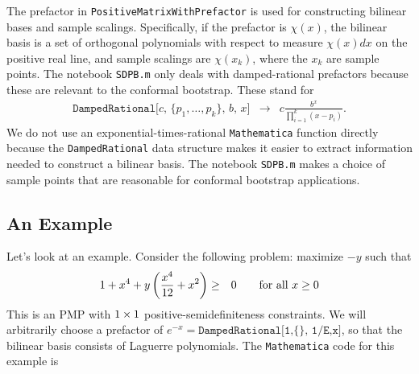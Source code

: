 \documentclass[12pt]{article}
\numberwithin{equation}{section}
\renewcommand{\be}{\begin{eqnarray}}
\renewcommand{\ee}{\end{eqnarray}}
\begin{document}
The prefactor in \texttt{PositiveMatrixWithPrefactor} is used for constructing bilinear bases and sample scalings.  Specifically, if the prefactor is $\chi(x)$, the bilinear basis is a set of orthogonal polynomials with respect to measure $\chi(x)dx$ on the positive real line, and sample scalings are $\chi(x_k)$, where the $x_k$ are sample points.
 The notebook \texttt{SDPB.m} only deals with damped-rational prefactors because these are relevant to the conformal bootstrap.  These stand for
\be
\texttt{DampedRational[$c$, \{$p_1,\dots,p_k$\}, $b$, $x$]} &\to& c\frac{b^x}{\prod_{i=1}^k (x-p_i)}.
\ee
We do not use an exponential-times-rational \texttt{Mathematica} function directly because the  \texttt{DampedRational} data structure makes it easier to extract information needed to construct a bilinear basis.  The notebook \texttt{SDPB.m} makes a choice of sample points that are reasonable for conformal bootstrap applications.

\subsection{An Example}
\label{sec:example}

Let's look at an example.  Consider the following problem: maximize $-y$ such that
\be
\label{eq:exampleproblem}
1+x^4 + y\p{\frac{x^4}{12} + x^2} &\geq& 0\qquad \textrm{for all $x\geq 0$}
\ee
This is an PMP with $1\times1$ positive-semidefiniteness constraints.  We will arbitrarily choose a prefactor of $e^{-x}=\texttt{DampedRational[1,\{\}, 1/E,x]}$, so that the bilinear basis consists of Laguerre polynomials.  The \texttt{Mathematica} code for this example is
\end{document}
